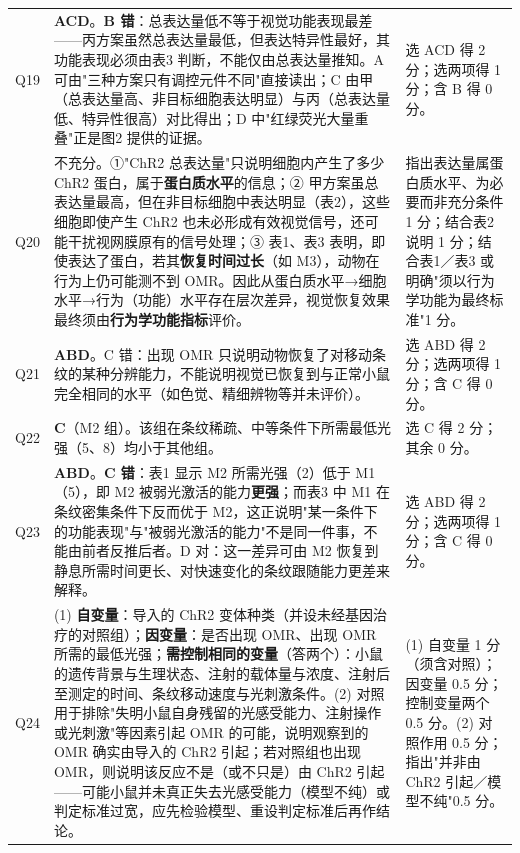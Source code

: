 \documentclass[UTF8,a4paper,11pt]{ctexart}
\begin{document}
\begin{longtable}{@{}p{0.85cm}p{9.7cm}p{4.2cm}@{}}
\addlinespace
Q19 & \textbf{ACD}。\textbf{B 错}：总表达量低不等于视觉功能表现最差——丙方案虽然总表达量最低，但表达特异性最好，其功能表现必须由表3 判断，不能仅由总表达量推知。A 可由"三种方案只有调控元件不同"直接读出；C 由甲（总表达量高、非目标细胞表达明显）与丙（总表达量低、特异性很高）对比得出；D 中"红绿荧光大量重叠"正是图2 提供的证据。 & 选 ACD 得 2 分；选两项得 1 分；含 B 得 0 分。 \\
\addlinespace
Q20 & 不充分。①"ChR2 总表达量"只说明细胞内产生了多少 ChR2 蛋白，属于\textbf{蛋白质水平}的信息；② 甲方案虽总表达量最高，但在非目标细胞中表达明显（表2），这些细胞即使产生 ChR2 也未必形成有效视觉信号，还可能干扰视网膜原有的信号处理；③ 表1、表3 表明，即使表达了蛋白，若其\textbf{恢复时间过长}（如 M3），动物在行为上仍可能测不到 OMR。因此从蛋白质水平→细胞水平→行为（功能）水平存在层次差异，视觉恢复效果最终须由\textbf{行为学功能指标}评价。 & 指出表达量属蛋白质水平、为必要而非充分条件 1 分；结合表2 说明 1 分；结合表1／表3 或明确"须以行为学功能为最终标准"1 分。 \\
\addlinespace
Q21 & \textbf{ABD}。C 错：出现 OMR 只说明动物恢复了对移动条纹的某种分辨能力，不能说明视觉已恢复到与正常小鼠完全相同的水平（如色觉、精细辨物等并未评价）。 & 选 ABD 得 2 分；选两项得 1 分；含 C 得 0 分。 \\
\addlinespace
Q22 & \textbf{C}（M2 组）。该组在条纹稀疏、中等条件下所需最低光强（5、8）均小于其他组。 & 选 C 得 2 分；其余 0 分。 \\
\addlinespace
Q23 & \textbf{ABD}。\textbf{C 错}：表1 显示 M2 所需光强（2）低于 M1（5），即 M2 被弱光激活的能力\textbf{更强}；而表3 中 M1 在条纹密集条件下反而优于 M2，这正说明"某一条件下的功能表现"与"被弱光激活的能力"不是同一件事，不能由前者反推后者。D 对：这一差异可由 M2 恢复到静息所需时间更长、对快速变化的条纹跟随能力更差来解释。 & 选 ABD 得 2 分；选两项得 1 分；含 C 得 0 分。 \\
\addlinespace
Q24 & (1) \textbf{自变量}：导入的 ChR2 变体种类（并设未经基因治疗的对照组）；\textbf{因变量}：是否出现 OMR、出现 OMR 所需的最低光强；\textbf{需控制相同的变量}（答两个）：小鼠的遗传背景与生理状态、注射的载体量与浓度、注射后至测定的时间、条纹移动速度与光刺激条件。(2) 对照用于排除"失明小鼠自身残留的光感受能力、注射操作或光刺激"等因素引起 OMR 的可能，说明观察到的 OMR 确实由导入的 ChR2 引起；若对照组也出现 OMR，则说明该反应不是（或不只是）由 ChR2 引起——可能小鼠并未真正失去光感受能力（模型不纯）或判定标准过宽，应先检验模型、重设判定标准后再作结论。 & (1) 自变量 1 分（须含对照）；因变量 0.5 分；控制变量两个 0.5 分。(2) 对照作用 0.5 分；指出"并非由 ChR2 引起／模型不纯"0.5 分。 \\

\end{longtable}
\end{document}
